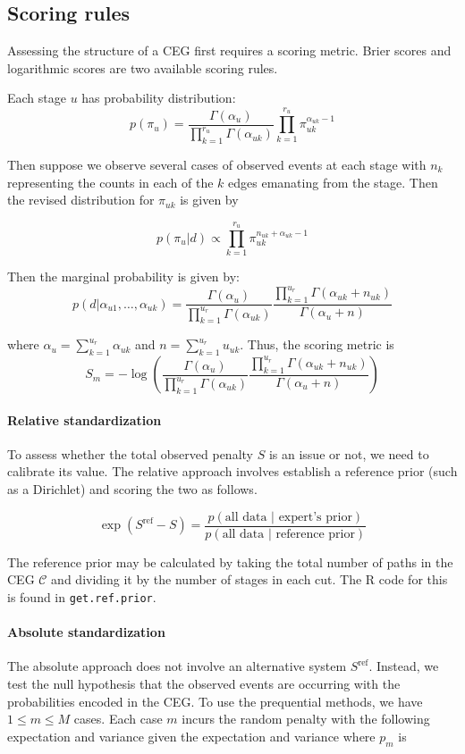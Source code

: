 \documentclass[12pt]{article}
\begin{document}
\subsection{Scoring rules}


Assessing the structure of a CEG first requires a scoring metric. Brier scores and logarithmic scores are two available scoring rules. 

Each stage $u$ has probability distribution:
\[
p(\pi_u) = \frac{\Gamma (\alpha_u)}{\prod_{k=1}^{r_u} \Gamma (\alpha_{uk})} \prod_{k=1}^{r_u} \pi_{uk} ^{\alpha_{uk}-1}
\]

Then suppose we observe several cases of observed events at each stage with $n_k$ representing the counts in each of the $k$ edges emanating from the stage. Then the  revised distribution for $\pi_{uk}$ is given by 

\[
p(\pi_u | d) \propto \prod_{k=1}^{r_u} \pi_{uk}^{n_{uk} +\alpha_{uk} -1}
\]

Then the marginal probability is given by: \[
p(d | \alpha_{u1}, \ldots, \alpha_{uk}) = \frac{\Gamma(\alpha_u)}{\prod_{k=1}^{u_r} \Gamma(\alpha_{uk})} \frac{\prod_{k=1}^{u_r}\Gamma(\alpha_{uk} + n_{uk})}{\Gamma(\alpha_u + n)}
\]

where $\alpha_u = \sum_{k=1}^{u_r} \alpha_{uk}$ and $n = \sum_{k=1}^{u_r} u_{uk}$. Thus, the scoring metric is 
\[
S_m = -\log \left(\frac{\Gamma(\alpha_u)}{\prod_{k=1}^{u_r} \Gamma(\alpha_{uk})} \frac{\prod_{k=1}^{u_r}\Gamma(\alpha_{uk} + n_{uk})}{\Gamma(\alpha_u + n)}\right)
\]

\paragraph{Relative standardization} To assess whether the total observed penalty $S$ is an issue or not, we need to calibrate its value. The relative approach involves establish a reference prior (such as a Dirichlet) and scoring the two as follows.

\[
\exp(S^{\text{ref}} - S) = \frac{p(\text{all data } | \text{ expert's prior})}{p(\text{all data } | \text{ reference prior})}
\]

The reference prior may be calculated by taking the total number of paths in the CEG $\mathcal{C}$ and dividing it by the number of stages in each cut. The R code for this is found in \texttt{get.ref.prior}. 

\paragraph{Absolute standardization} The absolute approach does not involve an alternative system $S^{\text{ref}}$. Instead, we test the null hypothesis that the observed events are occurring with the probabilities encoded in the CEG. To use the prequential methods, we have $1 \leq m \leq M$ cases. Each case $m$  incurs the random penalty with the following expectation and variance given the expectation and variance where $p_m$ is 
\end{document}
